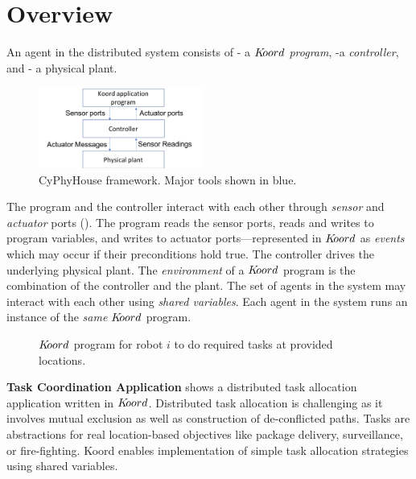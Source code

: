 \section{Overview}
\label{sec:overview}
     An agent in the distributed system consists of -
a $K\kern-2pt oord$ {\em program}, 
-a {\em controller}, and 
- a physical plant.

\begin{figure}[h!]
\centering
\includegraphics[width=0.48\textwidth]{figs/krdarch.png}
\caption{\small CyPhyHouse framework. Major tools shown in blue.}
\label{fig:arch}
\end{figure}
The program and the controller interact with each other through {\em sensor} and {\em actuator} ports ().  The program reads the sensor ports, reads and writes to program variables, and writes to actuator ports---represented in $K\kern-2pt oord$ as \emph{events} which may occur if their preconditions hold true. The controller drives the underlying physical plant. The \emph{environment} of a  $K\kern-2pt oord$ program is the combination of the controller and the plant. The set of agents in the system may interact with each other using {\em shared variables\/}. Each agent in the system runs an instance of the \emph{same} $K\kern-2pt oord$ program. 
\begin{figure}[ht!]
    \noindent
    \begin{mdframed}

    \begin{center}
        \scriptsize
        {}
        {}
    \end{center}
    \end{mdframed}

    \caption{$K\kern-2pt oord$ program for robot $i$ to do required tasks at provided locations.}
    \label{fig:taskapp}
\end{figure}
    
{\bf Task Coordination Application}  shows a distributed task allocation application written in $K\kern-2pt oord$. Distributed task allocation is challenging as it involves mutual exclusion as well as construction of de-conflicted  paths. Tasks are abstractions for real location-based objectives like package delivery, surveillance, or fire-fighting.  Koord enables implementation of simple task allocation strategies using shared variables.

